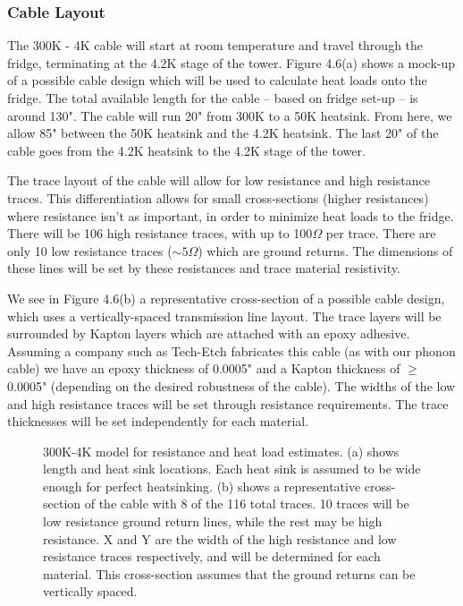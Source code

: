\documentclass{report}
\begin{document}

\subsubsection{Cable Layout}

The 300K - 4K cable will start at room temperature and travel through the fridge, terminating at the 4.2K stage of the tower. Figure 4.6(a) shows a mock-up of a possible cable design which will be used to calculate heat loads onto the fridge. The total available length for the cable -- based on fridge set-up -- is around 130". The cable will run 20" from 300K to a 50K heatsink. From here, we allow 85" between the 50K heatsink and the 4.2K heatsink. The last 20" of the cable goes from the 4.2K heatsink to the 4.2K stage of the tower.

The trace layout of the cable will allow for low resistance and high resistance traces. This differentiation allows for small cross-sections (higher resistances) where resistance isn't as important, in order to minimize heat loads to the fridge. There will be 106 high resistance traces, with up to 100$\Omega$ per trace. There are only 10 low resistance traces ($\sim 5 \Omega$) which are ground returns. The dimensions of these lines will be set by these resistances and trace material resistivity.

We see in Figure 4.6(b) a representative cross-section of a possible cable design, which uses a vertically-spaced transmission line layout. The trace layers will be surrounded by Kapton layers which are attached with an epoxy adhesive. Assuming a company such as Tech-Etch fabricates this cable (as with our phonon cable) we have an epoxy thickness of 0.0005" and a Kapton thickness of $\geq$0.0005" (depending on the desired robustness of the cable). The widths of the low and high resistance traces will be set through resistance requirements. The trace thicknesses will be set independently for each material.

\begin{figure}[ht]
\centering
{}
\caption{300K-4K model for resistance and heat load estimates. (a) shows length and heat sink locations. Each heat sink is assumed to be wide enough for perfect heatsinking. (b) shows a representative cross-section of the cable with 8 of the 116 total traces. 10 traces will be low resistance ground return lines, while the rest may be high resistance. X and Y are the width of the high resistance and low resistance traces respectively, and will be determined for each material. This cross-section assumes that the ground returns can be vertically spaced.}
\end{figure}
\end{document}
